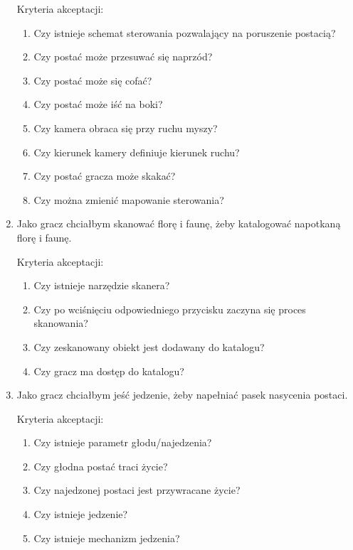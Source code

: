 \begin{enumerate}
        Kryteria akceptacji:
        \begin{enumerate}
            \item Czy istnieje schemat sterowania pozwalający na poruszenie postacią?
            \item Czy postać może przesuwać się naprzód?
            \item Czy postać może się cofać?
            \item Czy postać może iść na boki?
            \item Czy kamera obraca się przy ruchu myszy?
            \item Czy kierunek kamery definiuje kierunek ruchu?
            \item Czy postać gracza może skakać?
            \item Czy można zmienić mapowanie sterowania?
        \end{enumerate}
        
    \item Jako gracz chciałbym skanować florę i faunę, żeby katalogować napotkaną florę i faunę.
    
        Kryteria akceptacji:
        \begin{enumerate}
            \item Czy istnieje narzędzie skanera?
            \item Czy po wciśnięciu odpowiedniego przycisku zaczyna się proces skanowania?
            \item Czy zeskanowany obiekt jest dodawany do katalogu?
            \item Czy gracz ma dostęp do katalogu?
        \end{enumerate}
        
    \item Jako gracz chciałbym jeść jedzenie, żeby napełniać pasek nasycenia postaci.
    
    Kryteria akceptacji:
    \begin{enumerate}
        \item Czy istnieje parametr głodu/najedzenia?
        \item Czy głodna postać traci życie?
        \item Czy najedzonej postaci jest przywracane życie?
        \item Czy istnieje jedzenie?
        \item Czy istnieje mechanizm jedzenia?
    \end{enumerate}
    

\end{enumerate}
